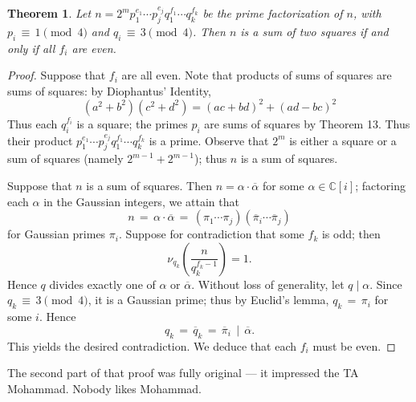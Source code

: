 \documentclass[11pt]{article}
\newtheorem{theorem}{Theorem}
\newcommand{\conjugate}[1]{\overline{#1}}
\begin{document}
\begin{adjustwidth}{0.5cm}{}
  \begin{theorem}
    Let $n = 2^{m} p_{1}^{e_{1}} \cdots p_{j}^{e_{j}} q_{1}^{f_{1}} \cdots q_{k}^{f_{k}}$ be the prime factorization of $n$, with $p_{i} \, \equiv  \, 1 \pmod{4}$ and $q_{i} \, \equiv  \, 3 \pmod{4}$. Then $n$ is a sum of two squares if and only if all $f_{i}$ are even.
  \end{theorem}
  \begin{proof}
    Suppose that $f_{i}$ are all even. Note that products of sums of squares are sums of squares: by Diophantus' Identity,
    \[
      (a^{2} + b^{2})(c^{2} + d^{2}) = (ac + bd)^{2} + (ad - bc)^{2}
    \]
    Thus each $q_{i}^{f_{i}}$ is a square; the primes $p_{i}$ are sums of squares by Theorem 13. Thus their product $p_{1}^{e_{1}} \cdots p_{j}^{e_{j}} q_{1}^{f_{1}} \cdots q_{k}^{f_{k}}$ is a prime. Observe that $2^{m}$ is either a square or a sum of squares (namely $2^{m - 1} + 2^{m - 1}$); thus $n$ is a sum of squares.

    Suppose that $n$ is a sum of squares. Then $n = \alpha \cdot \conjugate{\alpha}$ for some $\alpha \in \mathbb{C}[i]$; factoring each $\alpha$ in the Gaussian integers, we attain that
    \[
      n \, = \,  \alpha \cdot \conjugate{\alpha} \, = \, (\pi_{1} \cdots \pi_{j})(\conjugate{\pi}_{i} \cdots \conjugate{\pi}_{j})
    \]
    for Gaussian primes $\pi_{i}$. Suppose for contradiction that some $f_{k}$ is odd; then
    \[
      \nu_{q_{k}} \left( \frac{n}{q_{k}^{f_{k} - 1}} \right) = 1.
    \]
    Hence $q$ divides exactly one of $\alpha$ or $\conjugate{\alpha}$. Without loss of generality, let $q \mid \alpha$. Since $q_{k} \, \equiv \, 3 \pmod{4}$, it is a Gaussian prime; thus by Euclid's lemma, $q_{k} \, = \, \pi_{i}$ for some $i$. Hence
    \[
      q_{k} \, = \, \conjugate{q}_{k} \, = \, \conjugate{\pi}_{i} \, \mid \, \conjugate{\alpha}.
    \]
    This yields the desired contradiction. We deduce that each $f_{i}$ must be even.
  \end{proof}
\end{adjustwidth}

The second part of that proof was fully original --- it impressed the TA Mohammad. Nobody likes Mohammad.

\end{document}
